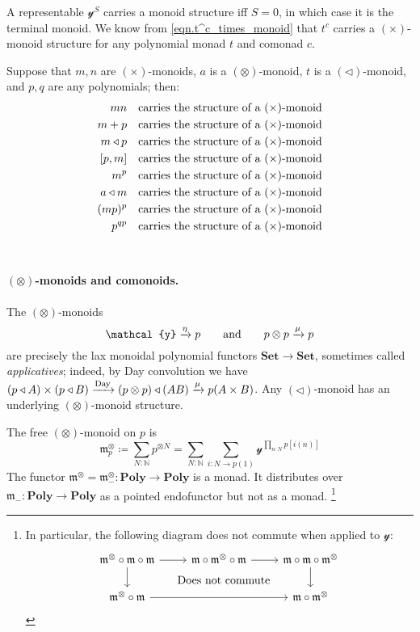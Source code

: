 \documentclass[11pt, one side, article]{memoir}
\theoremstyle{definition}
\theoremstyle{plain}
\newcommand{\Cat}[1]{\mathbf{#1}}%
\newcommand{\To}[2][]{\xrightarrow[#1]{\tn{$#2$}}}
\newcommand{\tn}[1]{\textnormal{#1}}
\newcommand{\nn}{\mathbb{N}}
\newcommand{\smset}{\Cat{Set}}
\newcommand{\yon}{{\mathcal{y}}}
\newcommand{\poly}{\Cat{Poly}}
\newcommand{\0}{\textsf{0}}
\newcommand{\1}{\tn{\textsf{1}}}
\newcommand{\tri}{\mathbin{\triangleleft}}
\newcommand{\free}{\mathfrak{m}}
\newcommand{\freecol}{\mathfrak{m}^\otimes}
\newcommand{\hh}[2][]{#1 \tn{#2} #1}
\newcommand{\qqand}{\hh[\qquad]{and}}
\begin{document}
A representable $\yon^S$ carries a monoid structure iff $S=0$, in which case it is the terminal monoid. We know from \eqref{eqn.t^c_times_monoid} that $t^c$ carries a $(\times)$-monoid structure for any polynomial monad $t$ and comonad $c$.

Suppose that $m,n$ are $(\times)$-monoids, $a$ is a $(\otimes)$-monoid, $t$ is a $(\tri)$-monoid, and $p, q$ are any polynomials; then:
\begin{align}
	mn&\quad\tn{carries the structure of a $(\times)$-monoid}\\
	m+p&\quad\tn{carries the structure of a $(\times)$-monoid}\\
	m\tri p&\quad\tn{carries the structure of a $(\times)$-monoid}\\
	[p,m]&\quad\tn{carries the structure of a $(\times)$-monoid}\\
	m^p&\quad\tn{carries the structure of a $(\times)$-monoid}\\
	a\tri m&\quad\tn{carries the structure of a $(\times)$-monoid}\\
	(mp)^p&\quad\tn{carries the structure of a $(\times)$-monoid}\\
	p^{qp}&\quad\tn{carries the structure of a $(\times)$-monoid}
\end{align}
\
\paragraph{$(\otimes)$-monoids and comonoids.}
The $(\otimes)$-monoids
\begin{equation}\label{eqn.otimes_monoids}
	\yon\To{\eta} p
	\qqand
	p\otimes p\To{\mu} p
\end{equation}
are precisely the lax monoidal polynomial functors $\smset\to\smset$, sometimes called \emph{applicatives}; indeed, by Day convolution we have $(p\tri A)\times (p\tri B)\To{\text{Day}} (p\otimes p)\tri(AB)\To{\mu}p(A\times B)$. Any $(\tri)$-monoid has an underlying $(\otimes)$-monoid structure.

The free $(\otimes)$-monoid on $p$ is 
\begin{equation}
	\freecol_p\coloneqq\sum_{N:\nn}p^{\otimes N}=\sum_{N:\nn}\sum_{i\colon N\to p(1)}\yon^{\prod_{n:N}p[i(n)]}
\end{equation}
The functor $\freecol=\freecol_-\colon\poly\to\poly$ is a monad. It distributes 
over $\free_-\colon\poly\to\poly$ as a pointed endofunctor but not as a monad.%
\footnote{In particular, the following diagram does not commute when applied to $\yon$:
\[
\begin{tikzcd}[ampersand replacement=\&]
  \freecol\circ\free\circ\free\ar[r]\ar[d]\&
  \free\circ\freecol\circ\free\ar[r]\&
  \free\circ\free\circ\freecol\ar[d]\\
  \freecol\circ\free\ar[rr]\&\&
  \free\circ\freecol\ar[ull, phantom, "\text{Does not commute}"]
\end{tikzcd}
\]
}
\end{document}
